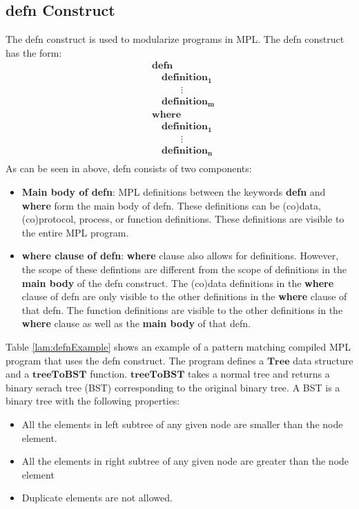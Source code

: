 \documentclass[11pt]{article}
\begin{document}
\subsection {defn Construct}\label{lam:defnOverview}
The {\sf defn} construct is used to modularize programs in MPL. The {\sf defn} construct has the form:
\begin{align*}
  & \mathbf{defn} \\ 
  &\mathbf{\quad definition_1} \\
  &\mathbf{\qquad\quad \vdots} \\
  &\mathbf{\quad definition_m}\\
  &\mathbf{where} \\ 
  &\mathbf{\quad definition_1} \\
  &\mathbf{\qquad\quad \vdots} \\
  &\mathbf{\quad definition_n}\\  
\end{align*}
As can be seen in above, {\sf defn} consists of two components:
\begin{itemize}
  \item {\bf Main body of defn}: MPL definitions between the keywords {\bf defn} and {\bf where} form the main body of {\sf defn}. These definitions can be (co)data, (co)protocol, process, or function definitions. These definitions are visible to the entire MPL program.

  \item {\bf where clause of defn}: {\bf where} clause also allows for definitions. However, the scope of these defintions are different from the scope of definitions in the {\bf main body} of the {\sf defn} construct. The (co)data definitions in the {\bf where} clause of {\sf defn} are only visible to the other definitions in the  {\bf where} clause of that {\sf defn}. The function definitions are visible to the other definitions in the  {\bf where} clause as well as the {\bf main body} of that {\sf defn}.
\end{itemize}  
Table \ref {lam:defnExample} shows an example of a pattern matching compiled MPL program that uses the {\sf defn} construct.
The program defines a $\mathbf{Tree}$ data structure and a $\mathbf{treeToBST}$ function. $\mathbf{treeToBST}$ takes a normal tree and returns a binary serach tree (BST) corresponding to the original binary tree. A BST is a binary tree with the following properties:
\begin{itemize} 
  \item All the elements in left subtree of any given node are smaller than the node element.
  \item All the elements in right subtree of any given node are greater than the node element
  \item Duplicate elements are not allowed.
\end{itemize}
\end{document}

